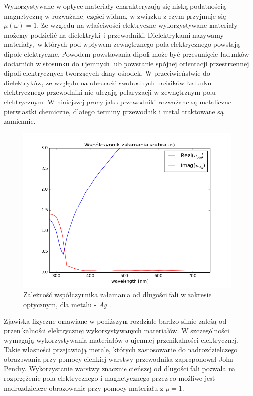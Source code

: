 Wykorzystywane w optyce materiały charakteryzują się niską podatnością magnetyczną w rozważanej części widma, w związku z czym przyjmuje się $\mu(\omega)=1$. Ze względu na właściwości elektryczne wykorzystywane materiały możemy  podzielić na dielektryki~i przewodniki. Dielektrykami nazywamy materiały,~w których pod wpływem zewnętrznego pola elektrycznego powstają dipole elektryczne. Powodem powstawania dipoli może być przesunięcie ładunków dodatnich w stosunku do ujemnych lub powstanie spójnej orientacji przestrzennej dipoli elektrycznych tworzących dany ośrodek. W przeciwieństwie do dielektryków, ze względu na obecność swobodnych nośników ładunku elektrycznego przewodniki nie ulegają polaryzacji w zewnętrznym polu elektrycznym. W niniejszej pracy jako przewodniki rozważane są metaliczne pierwiastki chemiczne, dlatego terminy przewodnik i metal traktowane są zamiennie.

\begin{figure}[tb]
	\includegraphics[width=\textwidth]{images/agn.png}
	\caption{Zależność współczynnika załamania od długości fali w zakresie optycznym, dla metalu - $Ag$ \cite{PhysRevB.6.4370}.  }
	\label{fig:agn}
\end{figure}
Zjawiska fizyczne omawiane w poniższym rozdziale bardzo silnie zależą od przenikalności elektrycznej wykorzystywanych materiałów. W szczególności wymagają wykorzystywania materiałów o ujemnej przenikalności elektrycznej. Takie własności przejawiają metale, których zastosowanie do nadrozdzielczego obrazowania przy pomocy cienkiej warstwy przewodnika zaproponował John Pendry. Wykorzystanie warstwy znacznie cieńszej od długości fali pozwala na rozprzężenie pola elektrycznego i magnetycznego przez co możliwe jest nadrozdzielcze obrazowanie przy pomocy materiału z $\mu=1$. \cite{PhysRevLett.85.3966}

